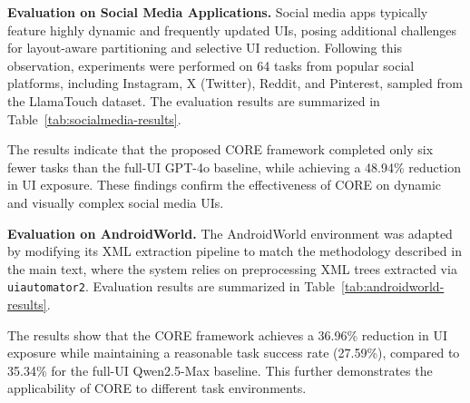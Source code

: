 \textbf{Evaluation on Social Media Applications.}  
Social media apps typically feature highly dynamic and frequently updated UIs, posing additional challenges for layout-aware partitioning and selective UI reduction. Following this observation, experiments were performed on 64 tasks from popular social platforms, including Instagram, X (Twitter), Reddit, and Pinterest, sampled from the LlamaTouch dataset. The evaluation results are summarized in Table~\ref{tab:socialmedia-results}.

\begin{table}[htbp]
  \centering
  \caption{Performance comparison on a subset of the LlamaTouch dataset (social media apps). The proposed framework maintains comparable success while substantially reducing UI exposure.}
  \label{tab:socialmedia-results}
\end{table}

The results indicate that the proposed CORE framework completed only six fewer tasks than the full-UI GPT-4o baseline, while achieving a 48.94\% reduction in UI exposure. These findings confirm the effectiveness of CORE on dynamic and visually complex social media UIs.

\textbf{Evaluation on AndroidWorld.}  
The AndroidWorld environment was adapted by modifying its XML extraction pipeline to match the methodology described in the main text, where the system relies on preprocessing XML trees extracted via \texttt{uiautomator2}. Evaluation results are summarized in Table~\ref{tab:androidworld-results}.

\begin{table}[!htbp]
  \centering
  \caption{Performance on the AndroidWorld environment using the modified XML extraction pipeline.}
  \label{tab:androidworld-results}
\end{table}

The results show that the CORE framework achieves a 36.96\% reduction in UI exposure while maintaining a reasonable task success rate (27.59\%), compared to 35.34\% for the full-UI Qwen2.5-Max baseline. This further demonstrates the applicability of CORE to different task environments.
